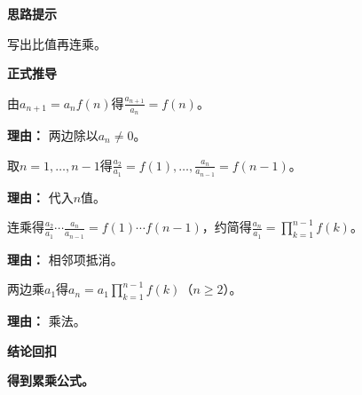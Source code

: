 \begin{proofbox}
	\textbf{\textcolor{CProof}{思路提示}}

	写出比值再连乘。

	\medskip
	\textbf{\textcolor{CProof}{正式推导}}
	\begin{description}[style=nextline, leftmargin=2.8em, labelsep=0.5em, itemsep=0.55em]
		\item[\textbf{步骤一（比值式）：}] 由$a_{n+1}=a_n f(n)$得$\frac{a_{n+1}}{a_n}=f(n)$。
			\par\textbf{理由：} 两边除以$a_n\neq0$。
		\item[\textbf{步骤二（列等式）：}] 取$n=1,\dots,n-1$得$\frac{a_2}{a_1}=f(1),\dots,\frac{a_n}{a_{n-1}}=f(n-1)$。
			\par\textbf{理由：} 代入$n$值。
		\item[\textbf{步骤三（连乘消元）：}] 连乘得$\frac{a_2}{a_1}\cdots\frac{a_n}{a_{n-1}}=f(1)\cdots f(n-1)$，约简得$\frac{a_n}{a_1}=\prod_{k=1}^{n-1}f(k)$。
			\par\textbf{理由：} 相邻项抵消。
		\item[\textbf{步骤四（得公式）：}] 两边乘$a_1$得$a_n=a_1\prod_{k=1}^{n-1}f(k)$（$n\ge2$）。
			\par\textbf{理由：} 乘法。
	\end{description}

	\medskip
	\textbf{\textcolor{CProof}{结论回扣}}

	\textbf{得到累乘公式。}
\end{proofbox}
